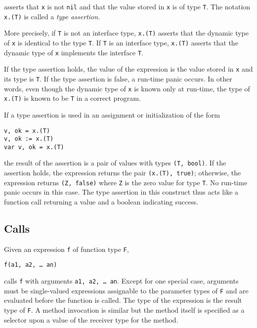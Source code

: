 asserts that \texttt{x} is not \texttt{nil} and that the value stored in
\texttt{x} is of type \texttt{T}. The notation \texttt{x.(T)} is called
a \emph{type assertion}.

More precisely, if \texttt{T} is not an interface type, \texttt{x.(T)}
asserts that the dynamic type of \texttt{x} is identical to the
type \texttt{T}. If \texttt{T} is an interface type, \texttt{x.(T)}
asserts that the dynamic type of \texttt{x} implements the interface
\texttt{T}.

If the type assertion holds, the value of the expression is the value
stored in \texttt{x} and its type is \texttt{T}. If the type assertion
is false, a run-time panic occurs. In
other words, even though the dynamic type of \texttt{x} is known only at
run-time, the type of \texttt{x.(T)} is known to be \texttt{T} in a
correct program.

If a type assertion is used in an assignment or initialization of the
form

\begin{Verbatim}[frame=single]
v, ok = x.(T)
v, ok := x.(T)
var v, ok = x.(T)
\end{Verbatim}

the result of the assertion is a pair of values with types \texttt{(T,
bool)}. If the assertion holds, the expression returns the pair
\texttt{(x.(T), true)}; otherwise, the expression returns \texttt{(Z,
false)} where \texttt{Z} is the zero value for type \texttt{T}. No
run-time panic occurs in this case. The type assertion in this
construct thus acts like a function call returning a value and a
boolean indicating success.

\subsection*{Calls}

Given an expression \texttt{f} of function type \texttt{F},

\begin{Verbatim}[frame=single]
f(a1, a2, … an)
\end{Verbatim}

calls \texttt{f} with arguments \texttt{a1, a2, \ldots{} an}. Except for
one special case, arguments must be single-valued expressions
assignable to the parameter types of
\texttt{F} and are evaluated before the function is called. The type of
the expression is the result type of \texttt{F}. A method invocation is
similar but the method itself is specified as a selector upon a value of
the receiver type for the method.

